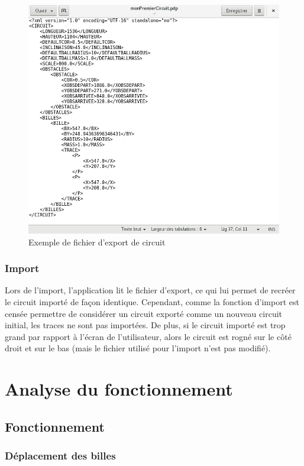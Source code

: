 \documentclass{report}
\begin{document}
\begin{figure}[H]
\centering
\includegraphics[scale=0.5]{fichier_pdp.png}
\caption{Exemple de fichier d'export de circuit}
\end{figure}

\subsubsection{Import}

Lors de l’import, l’application lit le fichier d’export, ce qui lui permet de recréer le circuit importé de façon identique. Cependant, comme la fonction d’import est censée permettre de considérer un circuit exporté comme un nouveau circuit initial, les traces ne sont pas importées. De plus, si le circuit importé est trop grand par rapport à l’écran de l’utilisateur, alors le circuit est rogné sur le côté droit et sur le bas (mais le fichier utilisé pour l’import n’est pas modifié).

\section{Analyse du fonctionnement}

\subsection{Fonctionnement}

\subsubsection{Déplacement des billes}
\end{document}
